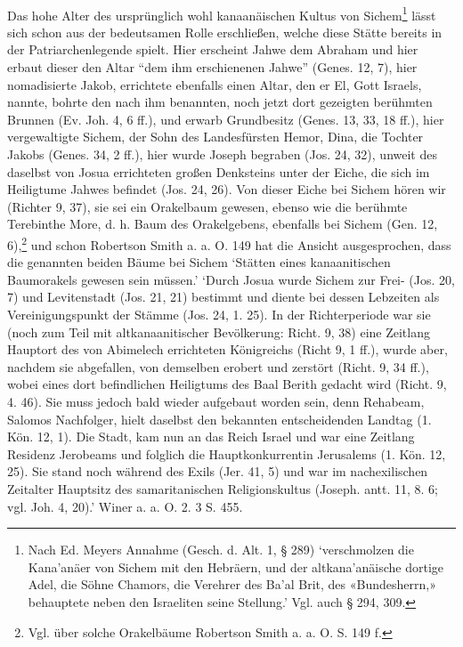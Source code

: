 \documentclass[a4paper, 11pt, oneside]{article}
\begin{document}
\paragraph{}
Das hohe Alter des ursprünglich wohl kanaanäischen Kultus von Sichem\footnote{Nach Ed. Meyers Annahme (Gesch. d. Alt. 1, § 289) `verschmolzen die Kana'anäer von Sichem mit den Hebräern, und der altkana'anäische dortige Adel, die Söhne Chamors, die Verehrer des Ba'al Brit, des «Bundesherrn,» behauptete neben den Israeliten seine Stellung.' Vgl. auch § 294, 309.} lässt sich schon aus der bedeutsamen Rolle erschließen, welche diese Stätte bereits in der Patriarchenlegende spielt. Hier erscheint Jahwe dem Abraham und hier erbaut dieser den Altar "`dem ihm erschienenen Jahwe"' (Genes. 12, 7), hier nomadisierte Jakob, errichtete ebenfalls einen Altar, den er El, Gott Israels, nannte, bohrte den nach ihm benannten, noch jetzt dort gezeigten berühmten Brunnen (Ev. Joh. 4, 6 ff.), und erwarb Grundbesitz (Genes. 13, 33, 18 ff.), hier vergewaltigte Sichem, der Sohn des Landesfürsten Hemor, Dina, die Tochter Jakobs (Genes. 34, 2 ff.), hier wurde Joseph begraben (Jos. 24, 32), unweit des daselbst von Josua errichteten großen Denksteins unter der Eiche, die sich im Heiligtume Jahwes befindet (Jos. 24, 26). Von dieser Eiche bei Sichem hören wir (Richter 9, 37), sie sei ein Orakelbaum gewesen, ebenso wie die berühmte Terebinthe More, d. h. Baum des Orakelgebens, ebenfalls bei Sichem (Gen. 12, 6),\footnote{Vgl. über solche Orakelbäume Robertson Smith a. a. O. S. 149 f.} und schon Robertson Smith a. a. O. 149 hat die Ansicht ausgesprochen, dass die genannten beiden Bäume bei Sichem `Stätten eines kanaanitischen Baumorakels gewesen sein müssen.' `Durch Josua wurde Sichem zur Frei- (Jos. 20, 7) und Levitenstadt (Jos. 21, 21) bestimmt und diente bei dessen Lebzeiten als Vereinigungspunkt der Stämme (Jos. 24, 1. 25). In der Richterperiode war sie (noch zum Teil mit altkanaanitischer Bevölkerung: Richt. 9, 38) eine Zeitlang Hauptort des von Abimelech errichteten Königreichs (Richt 9, 1 ff.), wurde aber, nachdem sie abgefallen, von demselben erobert und zerstört (Richt. 9, 34 ff.), wobei eines dort befindlichen Heiligtums des Baal Berith gedacht wird (Richt. 9, 4. 46). Sie muss jedoch bald wieder aufgebaut worden sein, denn Rehabeam, Salomos Nachfolger, hielt daselbst den bekannten entscheidenden Landtag (1. Kön. 12, 1). Die Stadt, kam nun an das Reich Israel und war eine Zeitlang Residenz Jerobeams und folglich die Hauptkonkurrentin Jerusalems (1. Kön. 12, 25). Sie stand noch während des Exils (Jer. 41, 5) und war im nachexilischen Zeitalter Hauptsitz des samaritanischen Religionskultus (Joseph. antt. 11, 8. 6; vgl. Joh. 4, 20).' Winer a. a. O. 2. 3 S. 455.
\end{document}
